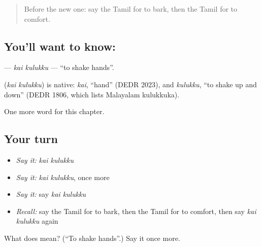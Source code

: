 \label{lesson:TA-C258-kai-kulukku}



\begin{quote}
Before the new one: say the Tamil for to bark, then the Tamil for to comfort.
\end{quote}

\subsection*{You'll want to know:  }
\textbf{ } — \emph{kai kulukku} — \textquotedblleft{}to shake hands\textquotedblright{}.

\begin{cousinweb}
\textbf{ } (\emph{kai kulukku}) is native: \emph{kai}, \textquotedblleft{}hand\textquotedblright{} (DEDR 2023), and \emph{kulukku}, \textquotedblleft{}to shake up and down\textquotedblright{} (DEDR 1806, which lists Malayalam kulukkuka).
\end{cousinweb}

\begin{grammarlens}[title={What you've built}]
One more word for this chapter.
\end{grammarlens}

\subsection*{Your turn}
\begin{itemize}
\raggedright
  \item \emph{Say it:} \emph{kai kulukku}
  \item \emph{Say it:} \emph{kai kulukku}, once more
  \item \emph{Say it:} say \emph{kai kulukku}
  \item \emph{Recall:} say the Tamil for to bark, then the Tamil for to comfort, then say \emph{kai kulukku} again
\end{itemize}

\begin{tcolorbox}[breakable,colback=teal!4,colframe=teal!35!black,title={Before you move on}]
What does   mean? (\textquotedblleft{}To shake hands\textquotedblright{}.) Say it once more.
\end{tcolorbox}
